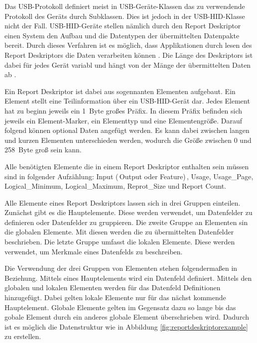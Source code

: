 Das USB-Protokoll definiert meist in USB-Geräte-Klassen das zu verwendende Protokoll des Geräts durch Subklassen. Dies ist jedoch in der USB-\acs{HID}-Klasse nicht der Fall. USB-\acs{HID}-Geräte stellen nämlich durch den Report Deskriptor einen System den Aufbau und die Datentypen der übermittelten Datenpakte bereit. \cite[S.~8]{usbHIDS} Durch dieses Verfahren ist es möglich, dass Applikationen durch lesen des Report Deskriptors die Daten verarbeiten können \cite[S.~24]{usbHIDS}. Die Länge des Deskriptors ist dabei für jedes Gerät variabl und hängt von der Mänge der übermittelten Daten ab \cite[S.~23]{usbHIDS}.

Ein Report Deskriptor ist dabei aus sogennanten Elementen aufgebaut. Ein Element stellt eine Teilinformation über ein USB-\acs{HID}-Gerät dar. Jedes Element hat zu beginn jeweils ein 1~Byte großes Präfix. In diesem Präfix befinden sich jeweils ein Element-Marker, ein Elementtyp und eine Elementengröße. Darauf folgend können optional Daten angefügt werden. Es kann dabei zwischen langen und kurzen Elementen unterschieden werden, wodurch die Größe zwischen 0 und 258~Byte groß sein kann. \cite[S.~14]{usbHIDS}

Alle benötigten Elemente die in einem Report Deskriptor enthalten sein müssen sind in folgender Aufzählung: Input (\,Output oder Feature)\,, Usage, Usage\_Page, Logical\_Minimum, Logical\_Maximum, Reprot\_Size und Report Count. \cite[S.~24]{usbHIDS}

Alle Elemente eines Report Deskriptors lassen sich in drei Gruppen einteilen. Zunächst gibt es die Hauptelemente. Diese werden verwendet, um Datenfelder zu definieren oder Datenfelder zu gruppieren. Die zweite Gruppe an Elementen sin die globalen Elemente. Mit diesen werden die zu übermittelten Datenfelder beschrieben. Die letzte Gruppe umfasst die lokalen Elemente. Diese werden verwendet, um Merkmale eines Datenfelds zu beschreiben. \cite[S.~16, S.~28, S.~35]{usbHIDS}

Die Verwendung der drei Gruppen von Elementen stehen folgendermaßen in Beziehung. Mittels eines Hauptelements wird ein Datenfeld definiert. Mittels den globalen und lokalen Elementen werden für das Datenfeld Definitionen hinzugefügt. Dabei gelten lokale Elemente nur für das nächst kommende Hauptelement. Globale Elemente gelten im Gegensatz dazu so lange bis das gobale Element durch ein anderes globale Element überschrieben wird. Dadurch ist es möglich die Datenstruktur wie in Abbildung \ref{fig:reportdeskriptorexample} zu erstellen. \cite[S.~24]{usbHIDS}

